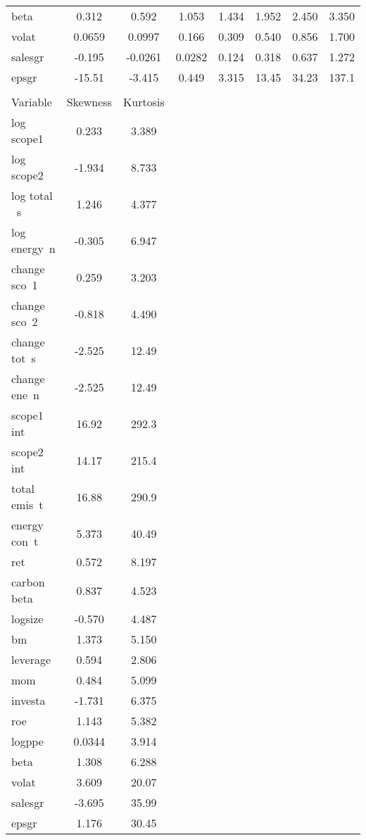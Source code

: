 \documentclass[]{article}
\begin{document}
\begin{tabular}{lccccccc}
beta & 0.312 & 0.592 & 1.053 & 1.434 & 1.952 & 2.450 & 3.350 \\
volat & 0.0659 & 0.0997 & 0.166 & 0.309 & 0.540 & 0.856 & 1.700 \\
salesgr & -0.195 & -0.0261 & 0.0282 & 0.124 & 0.318 & 0.637 & 1.272 \\
epsgr & -15.51 & -3.415 & 0.449 & 3.315 & 13.45 & 34.23 & 137.1 \\
 &  &  &  &  &  &  &  \\
Variable & Skewness & Kurtosis &  &  &  &  &  \\
log scope1 & 0.233 & 3.389 &  &  &  &  &  \\
log scope2 & -1.934 & 8.733 &  &  &  &  &  \\
log total ~s & 1.246 & 4.377 &  &  &  &  &  \\
log energy~n & -0.305 & 6.947 &  &  &  &  &  \\
change sco~1 & 0.259 & 3.203 &  &  &  &  &  \\
change sco~2 & -0.818 & 4.490 &  &  &  &  &  \\
change tot~s & -2.525 & 12.49 &  &  &  &  &  \\
change ene~n & -2.525 & 12.49 &  &  &  &  &  \\
scope1 int & 16.92 & 292.3 &  &  &  &  &  \\
scope2 int & 14.17 & 215.4 &  &  &  &  &  \\
total emis~t & 16.88 & 290.9 &  &  &  &  &  \\
energy con~t & 5.373 & 40.49 &  &  &  &  &  \\
ret & 0.572 & 8.197 &  &  &  &  &  \\
carbon beta & 0.837 & 4.523 &  &  &  &  &  \\
logsize & -0.570 & 4.487 &  &  &  &  &  \\
bm & 1.373 & 5.150 &  &  &  &  &  \\
leverage & 0.594 & 2.806 &  &  &  &  &  \\
mom & 0.484 & 5.099 &  &  &  &  &  \\
investa & -1.731 & 6.375 &  &  &  &  &  \\
roe & 1.143 & 5.382 &  &  &  &  &  \\
logppe & 0.0344 & 3.914 &  &  &  &  &  \\
beta & 1.308 & 6.288 &  &  &  &  &  \\
volat & 3.609 & 20.07 &  &  &  &  &  \\
salesgr & -3.695 & 35.99 &  &  &  &  &  \\
 epsgr & 1.176 & 30.45 &  &  &  &  &  \\ \hline
\end{tabular}
\end{document}
